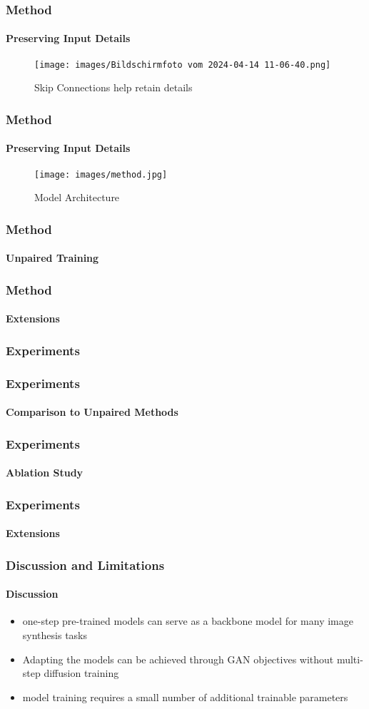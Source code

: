 \documentclass[aspectratio=169, lecture, amberg]{OTHAWbeamer}
\begin{document}
\begin{frame}
\frametitle{Method}
\framesubtitle{Preserving Input Details}
\begin{figure}
    \centering
    \texttt{[image: images/Bildschirmfoto vom 2024-04-14 11-06-40.png]}
    \caption{Skip Connections help retain details}
\end{figure}
\end{frame}

\begin{frame}
\frametitle{Method}
\framesubtitle{Preserving Input Details}

\begin{figure}
    \centering
    \texttt{[image: images/method.jpg]}
    \caption{Model Architecture}
\end{figure}
\end{frame}

\begin{frame}
\frametitle{Method}
\framesubtitle{Unpaired Training}

\end{frame}

\begin{frame}
\frametitle{Method}
\framesubtitle{Extensions}

\end{frame}

\begin{frame}
\frametitle{Experiments}


\end{frame}

\begin{frame}
\frametitle{Experiments}
\framesubtitle{Comparison to Unpaired Methods}

\end{frame}

\begin{frame}
\frametitle{Experiments}
\framesubtitle{Ablation Study}

\end{frame}

\begin{frame}
\frametitle{Experiments}
\framesubtitle{Extensions}

\end{frame}

\begin{frame}
\frametitle{Discussion and Limitations}
\framesubtitle{Discussion}
\begin{itemize}
    \item one-step pre-trained models can serve as a backbone model for many image synthesis tasks
    \item Adapting the models can be achieved through GAN objectives without multi-step diffusion training
    \item model training requires a small number of additional trainable parameters
\end{itemize}
\end{frame}
\end{document}

